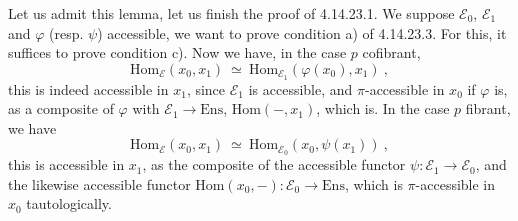\documentclass[11pt]{article}
\newcommand{\printedpage}[1]{\marginpar{\footnotesize p.~#1}}
\newcommand{\Ens}{\mathrm{Ens}}
\newcommand{\Hom}{\mathrm{Hom}}
\begin{document}
\printedpage{157}
Let us admit this lemma, let us finish the proof of 4.14.23.1. We suppose $\mathcal{E}_0$, $\mathcal{E}_1$ and $\varphi$ (resp. $\psi$) accessible, we want to prove condition a) of 4.14.23.3. For this, it suffices to prove condition c). Now we have, in the case $p$ cofibrant, %
\[
\Hom_{\mathcal{E}}(x_0,x_1)\ \simeq\ \Hom_{\mathcal{E}_1}(\varphi(x_0),x_1)\ ,
\]
this is indeed accessible in $x_1$, since $\mathcal{E}_1$ is accessible, and $\pi$-accessible in $x_0$ if $\varphi$ is, as a composite of $\varphi$ with $\mathcal{E}_1\longrightarrow\Ens$, $\Hom(-,x_1)$, which is. In the case $p$ fibrant, we have
\[
\Hom_{\mathcal{E}}(x_0,x_1)\ \simeq\ \Hom_{\mathcal{E}_0}(x_0,\psi(x_1))\ ,
\]
this is accessible in $x_1$, as the composite of the accessible functor $\psi:\mathcal{E}_1\longrightarrow\mathcal{E}_0$, and the likewise accessible functor $\Hom(x_0,-):\mathcal{E}_0\longrightarrow\Ens$, which is $\pi$-accessible in $x_0$ tautologically.
\end{document}
